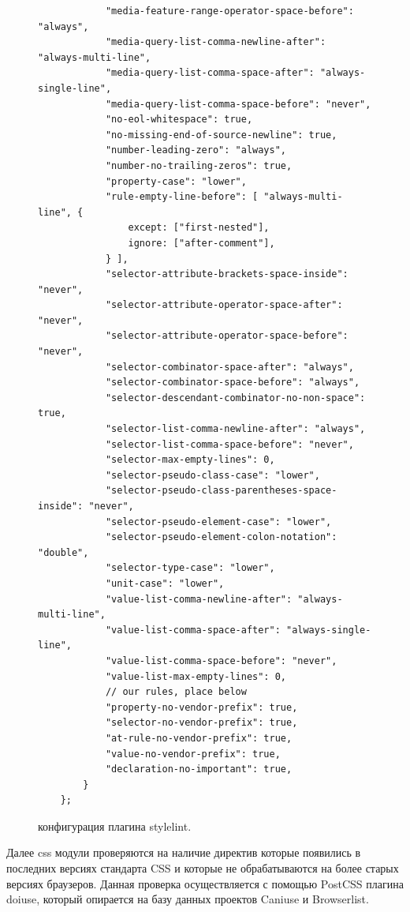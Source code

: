 \begin{figure}[h!]
\begin{small}
\begin{verbatim}
            "media-feature-range-operator-space-before": "always",
            "media-query-list-comma-newline-after": "always-multi-line",
            "media-query-list-comma-space-after": "always-single-line",
            "media-query-list-comma-space-before": "never",
            "no-eol-whitespace": true,
            "no-missing-end-of-source-newline": true,
            "number-leading-zero": "always",
            "number-no-trailing-zeros": true,
            "property-case": "lower",
            "rule-empty-line-before": [ "always-multi-line", {
                except: ["first-nested"],
                ignore: ["after-comment"],
            } ],
            "selector-attribute-brackets-space-inside": "never",
            "selector-attribute-operator-space-after": "never",
            "selector-attribute-operator-space-before": "never",
            "selector-combinator-space-after": "always",
            "selector-combinator-space-before": "always",
            "selector-descendant-combinator-no-non-space": true,
            "selector-list-comma-newline-after": "always",
            "selector-list-comma-space-before": "never",
            "selector-max-empty-lines": 0,
            "selector-pseudo-class-case": "lower",
            "selector-pseudo-class-parentheses-space-inside": "never",
            "selector-pseudo-element-case": "lower",
            "selector-pseudo-element-colon-notation": "double",
            "selector-type-case": "lower",
            "unit-case": "lower",
            "value-list-comma-newline-after": "always-multi-line",
            "value-list-comma-space-after": "always-single-line",
            "value-list-comma-space-before": "never",
            "value-list-max-empty-lines": 0,
            // our rules, place below
            "property-no-vendor-prefix": true,
            "selector-no-vendor-prefix": true,
            "at-rule-no-vendor-prefix": true,
            "value-no-vendor-prefix": true,
            "declaration-no-important": true,
        }
    };
\end{verbatim}
\end{small}
    \caption{конфигурация плагина stylelint.}
\end{figure}

 Далее css модули проверяются на наличие директив которые появились в последних версиях стандарта CSS и которые не обрабатываются на более старых версиях браузеров. Данная проверка осуществляется с помощью PostCSS плагина doiuse, который опирается на базу данных проектов Caniuse и Browserlist. 
 

